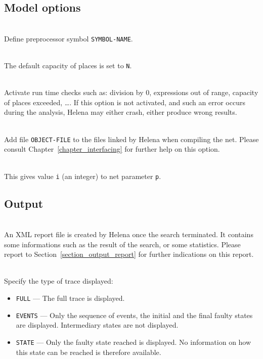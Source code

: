 \subsection{Model options}
\begin{description}
\item{}\\ Define
  preprocessor symbol \texttt{SYMBOL-NAME}.
\item{}\\ The default capacity of places is
  set to \texttt{N}.
\item{}\\ Activate run time checks such
  as: division by 0, expressions out of range, capacity of places
  exceeded, \dots. If this option is not activated, and such an error
  occurs during the analysis, Helena may either crash, either produce
  wrong results.
\item{}\\ Add file \texttt{OBJECT-FILE}
  to the files linked by Helena when compiling the net.  Please
  consult Chapter~\ref{chapter_interfacing} for further help on this
  option.
\item{}\\ This gives value \texttt{i}
  (an integer) to net parameter \texttt{p}.
\end{description}

\subsection{Output}
\begin{description}
\item{}\\ An XML report
  file is created by Helena once the search terminated.  It contains
  some informations such as the result of the search, or some
  statistics.  Please report to Section~\ref{section_output_report}
  for further indications on this report.
\item{}\\ Specify the type of trace
  displayed:
\begin{itemize}
\item\texttt{FULL} --- The full trace is displayed.
\item\texttt{EVENTS} --- Only the sequence of events, the initial and
  the final faulty states are displayed.  Intermediary states are not
  displayed.
\item\texttt{STATE} --- Only the faulty state reached is displayed.  No
  information on how this state can be reached is therefore available.
\end{itemize}
\end{description}

